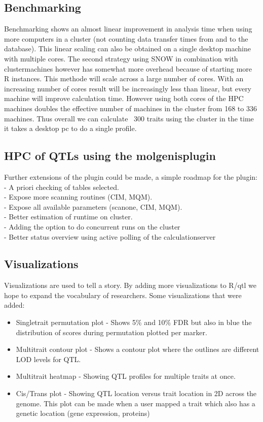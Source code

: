 \subsection{Benchmarking}
Benchmarking shows an almost linear improvement in analysis time when using more computers in a cluster 
(not counting data transfer times from and to the database). This linear scaling can also be obtained on a single desktop
machine with multiple cores. The second strategy using SNOW in combination with clustermachines however has somewhat 
more overhead because of starting more R instances. This methode will scale across a large number of cores. With an increasing number of cores result will be increasingly less than linear, but every machine will improve calculation time.
However using both cores of the HPC machines doubles the effective number of machines in the cluster from 168 to 336 machines. Thus 
overall we can calculate ~300 traits using the cluster in the time it takes a desktop pc to do a single profile.

\subsection{HPC of QTLs using the molgenisplugin}
Further extensions of the plugin could be made, a simple roadmap for the plugin:
\\- A priori checking of tables selected.
\\- Expose more scanning routines (CIM, MQM).
\\- Expose all available parameters (scanone, CIM, MQM).
\\- Better estimation of runtime on cluster.
\\- Adding the option to do concurrent runs on the cluster
\\- Better status overview using active polling of the calculationserver

\subsection{Visualizations}
Visualizations are used to tell a story. By adding more visualizations to  R/qtl we hope to expand the vocabulary of researchers.
Some visualizations that were added:
\begin{itemize}
\item Singletrait permutation plot - Shows 5\% and 10\% FDR but also in blue the distribution of scores during permutation plotted per marker.
\item Multitrait contour plot - Shows a contour plot where the outlines are different LOD levels for QTL.
\item Multitrait heatmap - Showing QTL profiles for multiple traits at once.
\item Cis/Trans plot - Showing QTL location versus trait location in 2D across the genome. This plot can be made when a user mapped a trait which also has a genetic location (gene expression, proteins)
\end{itemize}